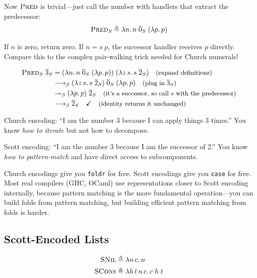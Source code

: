 \documentclass[11pt,a4paper]{article}
\theoremstyle{definition}
\newcommand{\lam}{\lambda}
\newcommand{\reduce}{\longrightarrow_\beta}
\newcommand{\reduces}{\twoheadrightarrow_\beta}
\newcommand{\church}[1]{\overline{#1}}
\newcommand{\rmark}[1]{\quad\text{\small(#1)}}
\begin{document}
Now $\textsc{Pred}$ is trivial---just call the number with handlers that
extract the predecessor:
\[
\textsc{Pred}_S \triangleq \lam n.\, n\; \church{0}_S\; (\lam p.\, p)
\]

If $n$ is zero, return zero. If $n = s\;p$, the successor handler receives $p$
directly. Compare this to the complex pair-walking trick needed for Church
numerals!

\begin{workedexample}[$\textsc{Pred}_S\;\church{3}_S = \church{2}_S$]
\begin{align*}
  \textsc{Pred}_S\;\church{3}_S
  &= (\lam n.\, n\;\church{0}_S\;(\lam p.\, p))\;(\lam z\, s.\, s\;\church{2}_S)
    \rmark{expand definitions} \\
  &\reduce (\lam z\, s.\, s\;\church{2}_S)\;\church{0}_S\;(\lam p.\, p)
    \rmark{plug in $\church{3}_S$} \\
  &\reduces (\lam p.\, p)\;\church{2}_S
    \rmark{it's a successor, so call $s$ with the predecessor} \\
  &\reduce \church{2}_S \quad\checkmark
    \rmark{identity returns it unchanged}
\end{align*}
\end{workedexample}

\begin{intuition}
Church encoding: ``I am the number 3 because I can apply things 3 times.''
You know \emph{how to iterate} but not how to decompose.

Scott encoding: ``I am the number 3 because I am the successor of 2.''
You know \emph{how to pattern-match} and have direct access to subcomponents.

Church encodings give you \texttt{foldr} for free. Scott encodings give you
\texttt{case} for free. Most real compilers (GHC, OCaml) use representations
closer to Scott encoding internally, because pattern matching is the more
fundamental operation---you can build folds from pattern matching, but building
efficient pattern matching from folds is harder.
\end{intuition}

\subsection{Scott-Encoded Lists}

\begin{align*}
\textsc{SNil}  &\triangleq \lam n\, c.\, n \\
\textsc{SCons} &\triangleq \lam h\, t\, n\, c.\, c\; h\; t
\end{align*}
\end{document}
